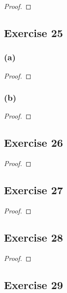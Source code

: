 \documentclass[14pt]{extarticle}
\begin{document}
\begin{proof}

\end{proof}

\subsection{Exercise 25}

\subsubsection{(a)}

\begin{proof}

\end{proof}

\subsubsection{(b)}

\begin{proof}

\end{proof}

\subsection{Exercise 26}

\begin{proof}

\end{proof}

\subsection{Exercise 27}

\begin{proof}

\end{proof}

\subsection{Exercise 28}

\begin{proof}

\end{proof}

\subsection{Exercise 29}
\end{document}
